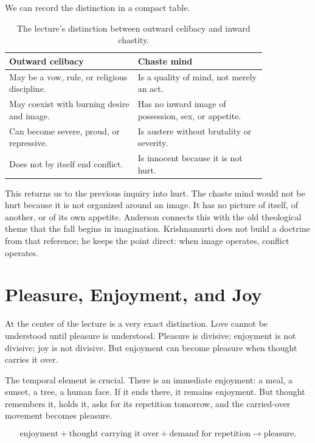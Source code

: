 We can record the distinction in a compact table.

\begin{table}
\centering
\begin{tabular}{|p{0.42\linewidth}|p{0.42\linewidth}|}
\hline
\textbf{Outward celibacy} & \textbf{Chaste mind} \\
\hline
May be a vow, rule, or religious discipline. & Is a quality of mind, not merely an act. \\
\hline
May coexist with burning desire and image. & Has no inward image of possession, sex, or appetite. \\
\hline
Can become severe, proud, or repressive. & Is austere without brutality or severity. \\
\hline
Does not by itself end conflict. & Is innocent because it is not hurt. \\
\hline
\end{tabular}
\caption{The lecture's distinction between outward celibacy and inward chastity.}
\end{table}

This returns us to the previous inquiry into hurt. The chaste mind would not be hurt because it is not organized around an image. It has no picture of itself, of another, or of its own appetite. Anderson connects this with the old theological theme that the fall begins in imagination. Krishnamurti does not build a doctrine from that reference; he keeps the point direct: when image operates, conflict operates.

\section{Pleasure, Enjoyment, and Joy}

At the center of the lecture is a very exact distinction. Love cannot be understood until pleasure is understood. Pleasure is divisive; enjoyment is not divisive; joy is not divisive. But enjoyment can become pleasure when thought carries it over.

The temporal element is crucial. There is an immediate enjoyment: a meal, a sunset, a tree, a human face. If it ends there, it remains enjoyment. But thought remembers it, holds it, asks for its repetition tomorrow, and the carried-over movement becomes pleasure.

\begin{equation}
\text{enjoyment}
+
\text{thought carrying it over}
+
\text{demand for repetition}
\longrightarrow
\text{pleasure}.
\end{equation}

